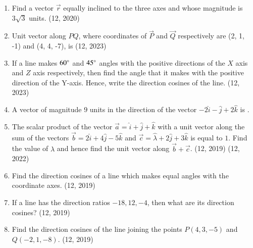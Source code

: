 \begin{enumerate}[label=\thesubsection.\arabic*,  ref=\thesubsection.\theenumi]
\item Find a vector $\overrightarrow{r}$ equally inclined to the three axes and whose magnitude is $3\sqrt{3}$ units.
\hfill (12,  2020)
    \item Unit vector along $PQ$,  where coordinates of $\vec{P}$ and $\vec{Q}$ respectively are (2, 1, -1) and (4, 4, -7),  is
    \hfill (12,  2023)
    \item If a line makes $60\degree$ and $45\degree$ angles with the positive directions of the $X$ axis and $Z$ axis respectively, then find the angle that it makes with the positive direction of the Y-axis. Hence, write the direction cosines of the line.
    \hfill (12, 2023)
    \item A vector of magnitude $9$ units in the direction of the vector $-2\hat{i} - \hat{j} + 2\hat{k}$ is \underline{\hspace{1cm}}.
	\item The scalar product of the vector $\overrightarrow{a} = \hat{i} + \hat{j} + \hat{k}$ with a unit vector along the sum of the vectors $\overrightarrow{b} = 2\hat{i} + 4\hat{j} - 5\hat{k}$ and $\overrightarrow{c} = \hat{\lambda} + 2\hat{j} + 3\hat{k}$ is equal to $1$. Find the value of $\lambda$ and hence find the unit vector along $\overrightarrow{b} + \overrightarrow{c}$. \hfill (12, 2019)
    \hfill (12, 2022)
	\item Find the direction cosines of a line which makes equal angles with the coordinate axes. \hfill (12, 2019)
	\item If a line has the direction ratios $-18, 12, -4$, then what are its direction cosines? \hfill (12, 2019)
	\item Find the direction cosines of the line joining the points $P(4, 3, -5)$ and $Q(-2, 1, -8)$. \hfill (12, 2019)
\end{enumerate}
